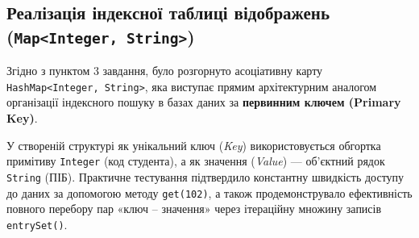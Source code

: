 \subsection{Реалізація індексної таблиці відображень (\texttt{Map<Integer, String>})}

Згідно з пунктом 3 завдання, було розгорнуто асоціативну карту 
\texttt{HashMap<Integer, String>}, яка виступає прямим архітектурним аналогом 
організації індексного пошуку в базах даних за \textbf{первинним ключем (Primary Key)}.

У створеній структурі як унікальний ключ (\textit{Key}) використовується 
обгортка примітиву \texttt{Integer} (код студента), а як значення 
(\textit{Value}) — об'єктний рядок \texttt{String} (ПІБ). Практичне 
тестування підтвердило константну швидкість доступу до даних за допомогою методу 
\texttt{get(102)}, а також продемонструвало ефективність повного перебору 
пар «ключ -- значення» через ітераційну множину записів \texttt{entrySet()}.
